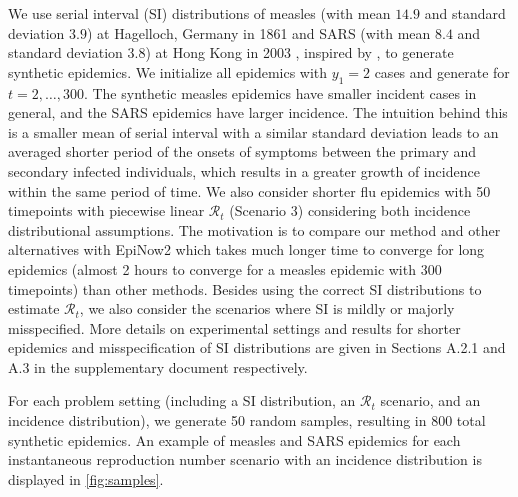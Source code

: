 \documentclass[10pt,letterpaper]{article}
\def\calR{\mathcal{R}}
\begin{document}
We use serial interval (SI) distributions of measles (with mean $14.9$ and standard 
deviation $3.9$) at Hagelloch, Germany in 1861 \cite{groendyke2011bayesian} and 
SARS (with mean $8.4$ and standard deviation $3.8$) at Hong Kong in 2003 
\cite{lipsitch2003transmission}, inspired by \cite{cori2013new}, to generate synthetic 
epidemics. We initialize all epidemics with $y_1=2$ cases and generate for $t=2,\ldots,300$. 
The synthetic measles epidemics have smaller incident cases in general, and the SARS 
epidemics have larger incidence. The intuition behind this is a smaller mean
of serial interval with a similar standard deviation leads to an averaged shorter period 
of the onsets of symptoms between the primary and secondary infected individuals, which 
results in a greater growth of incidence within the same period of time. 
We also consider shorter flu epidemics with 50 timepoints with piecewise linear $\calR_t$ (Scenario 3)
considering both incidence distributional assumptions. The motivation is to compare our method and 
other alternatives with EpiNow2 which takes much longer time to converge 
for long epidemics (almost 2 hours to converge for a measles epidemic 
with 300 timepoints) than other methods.  
Besides using the correct SI distributions to estimate $\calR_t$, we also consider 
the scenarios where SI is mildly or majorly misspecified. 
More details on experimental settings and results for shorter epidemics and misspecification 
of SI distributions are given in Sections A.2.1 and A.3 in the supplementary document respectively. 

For each problem setting (including a SI distribution, an $\calR_t$ scenario, 
and an incidence distribution), we generate 50 random samples, resulting in 
$800$ total synthetic epidemics. 
An example of measles and SARS epidemics for each instantaneous reproduction number scenario
with an incidence distribution is displayed in \autoref{fig:samples}. 
\end{document}
